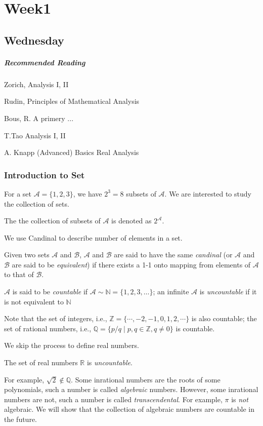 
\chapter{Week1}

\section{Wednesday}
 
\paragraph{Recommended Reading}
Zorich, Analysis I, II

Rudin, Principles of Mathematical Analysis

Bous, R. A primery ...

T.Tao Analysis I, II

A. Knapp (Advanced) Basics Real Analysis

\subsection{Introduction to Set}
For a set $\mathcal{A}=\{1,2,3\}$, we have $2^3=8$ subsets of $\mathcal{A}$. We are interested to study the collection of sets.
\begin{definition}
The the collection of subsets of $\mathcal{A}$ is denoted as $2^{\mathcal{A}}$.
\end{definition}

We use Candinal to describe number of elements in a set. 
\begin{definition}
Given two sets $\mathcal{A}$ and $\mathcal{B}$, $\mathcal{A}$ and $\mathcal{B}$ are said to have the same \emph{candinal} (or $\mathcal{A}$ and $\mathcal{B}$ are said to be \emph{equivalent}) if there exists a 1-1 onto mapping from elements of $\mathcal{A}$ to that of $\mathcal{B}$.
\end{definition}
\begin{definition}[Countability]
$\mathcal{A}$ is said to be \emph{countable} if $\mathcal{A}\sim\mathbb{N}=\{1,2,3,\dots\}$; an infinite $\mathcal{A}$ is \emph{uncountable} if it is not equivalent to $\mathbb{N}$
\end{definition}
\begin{remark}
Note that the set of integers, i.e., $\mathbb{Z}=\{\cdots,-2,-1,0,1,2,\cdots\}$ is also countable; the set of rational numbers, i.e., $\mathbb{Q}=\{p/q\mid p,q\in\mathbb{Z}, q\ne0\}$ is countable.
\end{remark}
We skip the process to define real numbers.
\begin{proposition}\label{Pro:1:1}
The set of real numbers $\mathbb{R}$ is \emph{uncountable}.
\end{proposition}
For example, $\sqrt{2}\notin\mathbb{Q}$. Some inrational numbers are the roots of some polynomials, such a number is called \emph{algebraic} numbers. However, some inrational numbers are not, such a number is called \emph{transcendental}. For example, $\pi$ is \emph{not} algebraic. We will show that the collection of algebraic numbers are countable in the future.

